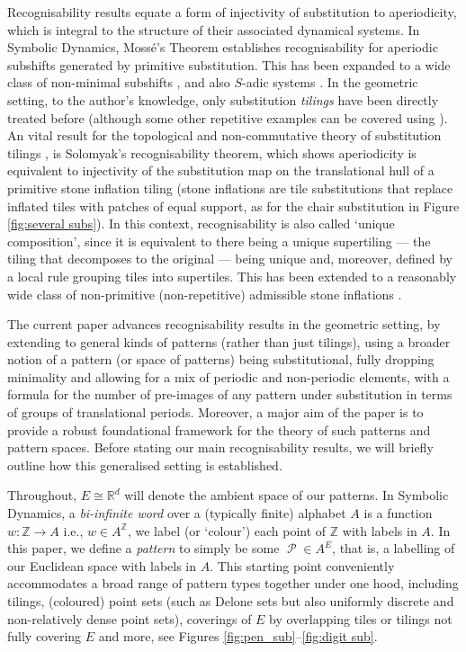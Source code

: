 \documentclass[11pt]{amsart}
\numberwithin{equation}{section}
\theoremstyle{plain}
\theoremstyle{definition}
\newcommand{\R}{\mathbb R}
\newcommand{\Z}{\mathbb Z}
\DeclareMathOperator{\cP}{\mathcal{P}}
\begin{document}
Recognisability results equate a form of injectivity of substitution to aperiodicity, which is integral to the structure of their associated dynamical systems. In Symbolic Dynamics, Moss\'{e}'s Theorem \cite{Mos92,Mos96} establishes recognisability for aperiodic subshifts generated by primitive substitution. This has been expanded to a wide class of non-minimal subshifts \cite{BKM09,BPR23}, and also \(S\)-adic systems \cite{BSTY19,BPRS25}. In the geometric setting, to the author's knowledge, only substitution \emph{tilings} \cite{Thu89} have been directly treated before (although some other repetitive examples can be covered using \cite{Sol07,PS01}). An vital result for the topological and non-commutative theory of substitution tilings \cite{AP98}, is Solomyak's recognisability theorem, which shows aperiodicity is equivalent to injectivity of the substitution map on the translational hull of a primitive stone inflation tiling \cite{Sol98} (stone inflations are tile substitutions that replace inflated tiles with patches of equal support, as for the chair substitution in Figure \ref{fig:several subs}). In this context, recognisability is also called `unique composition', since it is equivalent to there being a unique supertiling --- the tiling that decomposes to the original --- being unique and, moreover, defined by a local rule grouping tiles into supertiles. This has been extended to a reasonably wide class of non-primitive (non-repetitive) admissible stone inflations \cite{CS11}.

The current paper advances recognisability results in the geometric setting, by extending to general kinds of patterns (rather than just tilings), using a broader notion of a pattern (or space of patterns) being substitutional, fully dropping minimality and allowing for a mix of periodic and non-periodic elements, with a formula for the number of pre-images of any pattern under substitution in terms of groups of translational periods. Moreover, a major aim of the paper is to provide a robust foundational framework for the theory of such patterns and pattern spaces. Before stating our main recognisability results, we will briefly outline how this generalised setting is established.

Throughout, \(E \cong \R^d\) will denote the ambient space of our patterns. In Symbolic Dynamics, a \emph{bi-infinite word} over a (typically finite) alphabet \(A\) is a function \(w \colon \Z \to A\) i.e., \(w \in A^\Z\), we label (or `colour') each point of \(\Z\) with labels in \(A\). In this paper, we define a \emph{pattern} to simply be some \(\cP \in A^E\), that is, a labelling of our Euclidean space with labels in \(A\). This starting point conveniently accommodates a broad range of pattern types together under one hood, including tilings, (coloured) point sets (such as Delone sets but also uniformly discrete and non-relatively dense point sets), coverings of \(E\) by overlapping tiles or tilings not fully covering \(E\) and more, see Figures \ref{fig:pen_sub}--\ref{fig:digit sub}.
\end{document}
